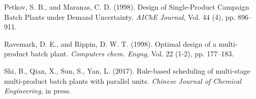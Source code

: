 \documentclass[authoryear,manuscript,12pt]{elsarticle}
\begin{document}
\begin{thebibliography}{1}
Petkov, S. B., and Maranas, C. D. (1998). Design of Single-Product Campaign Batch Plants under Demand Uncertainty. {\it  AIChE Journal}, Vol. 44 (4), pp. 896--911.

Ravemark, D. E., and Rippin, D. W. T. (1998). Optimal design of a multi-product batch plant. {\it Computers chem. Engng}, Vol. 22 (1-2), pp. 177--183.

Shi, B., Qian, X., Sun, S., Yan, L. (2017). Rule-based scheduling of multi-stage multi-product batch plants with parallel units. {\it Chinese Journal of Chemical Engineering}, in press.

\end{thebibliography}
\end{document}
